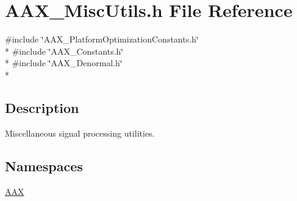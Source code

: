 \hypertarget{a00271}{}\section{A\+A\+X\+\_\+\+Misc\+Utils.\+h File Reference}
\label{a00271}
{\ttfamily \#include \char`\"{}A\+A\+X\+\_\+\+Platform\+Optimization\+Constants.\+h\char`\"{}}\\*
{\ttfamily \#include \char`\"{}A\+A\+X\+\_\+\+Constants.\+h\char`\"{}}\\*
{\ttfamily \#include \char`\"{}A\+A\+X\+\_\+\+Denormal.\+h\char`\"{}}\\*


\subsection{Description}
Miscellaneous signal processing utilities. 

\subsection*{Namespaces}
\begin{DoxyCompactItemize}
\item 
 \hyperlink{a00288}{A\+A\+X}
\end{DoxyCompactItemize}
